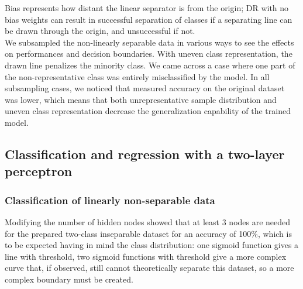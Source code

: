 \documentclass[a4paper]{article}
\begin{document}
Bias represents how distant the linear separator is from the origin; DR with no bias weights can result in successful separation of classes if a separating line can be drawn through the origin, and unsuccessful if not.\\
We subsampled the non-linearly separable data in various ways to see the effects on performances and decision boundaries. With uneven class representation, the drawn line penalizes the minority class. We came across a case where one part of the non-representative class was entirely misclassified by the model.
In all subsampling cases, we noticed that measured accuracy on the original dataset  was lower, which means that both unrepresentative sample distribution and uneven class representation decrease the generalization capability of the trained model.
\subsection{Classification and regression with a two-layer perceptron} %
\subsubsection{Classification of linearly non-separable data}

Modifying the number of hidden nodes showed that at least 3 nodes are needed for the prepared two-class inseparable dataset for an accuracy of 100\%, which is to be expected having in mind the class distribution: one sigmoid function gives a line with threshold, two sigmoid functions with threshold give a more complex curve that, if observed, still cannot theoretically separate this dataset, so a more complex boundary must be created.
\end{document}
